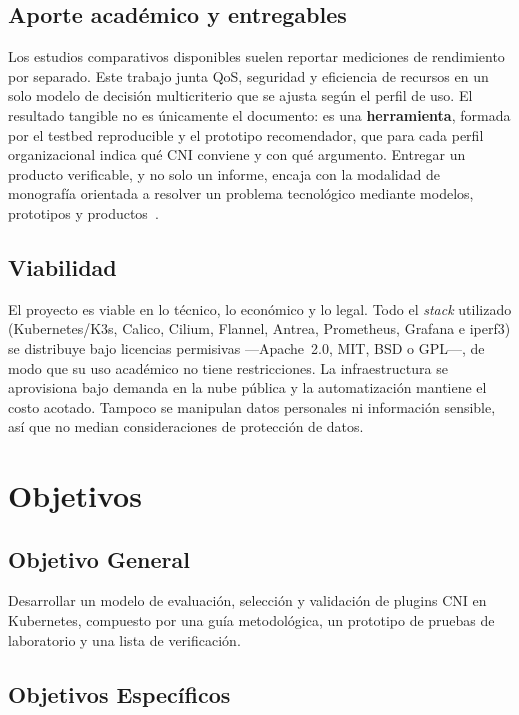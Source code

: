 \subsection{Aporte académico y entregables}

Los estudios comparativos disponibles suelen reportar mediciones de rendimiento por separado. Este trabajo junta QoS, seguridad y eficiencia de recursos en un solo modelo de decisión multicriterio que se ajusta según el perfil de uso. El resultado tangible no es únicamente el documento: es una \textbf{herramienta}, formada por el testbed reproducible y el prototipo recomendador, que para cada perfil organizacional indica qué CNI conviene y con qué argumento. Entregar un producto verificable, y no solo un informe, encaja con la modalidad de monografía orientada a resolver un problema tecnológico mediante modelos, prototipos y productos~\cite{ref29}.

\subsection{Viabilidad}

El proyecto es viable en lo técnico, lo económico y lo legal. Todo el \emph{stack} utilizado (Kubernetes/K3s, Calico, Cilium, Flannel, Antrea, Prometheus, Grafana e iperf3) se distribuye bajo licencias permisivas ---Apache~2.0, MIT, BSD o GPL---, de modo que su uso académico no tiene restricciones. La infraestructura se aprovisiona bajo demanda en la nube pública y la automatización mantiene el costo acotado. Tampoco se manipulan datos personales ni información sensible, así que no median consideraciones de protección de datos.

\section{Objetivos} \label{sec:Objetivos}

\subsection{Objetivo General}

Desarrollar un modelo de evaluación, selección y validación de plugins CNI en Kubernetes, compuesto por una guía metodológica, un prototipo de pruebas de laboratorio y una lista de verificación.

\subsection{Objetivos Específicos}

